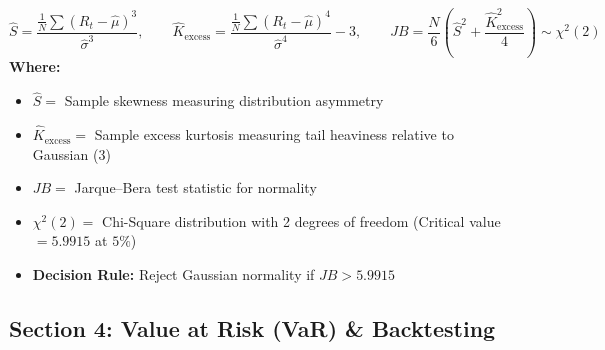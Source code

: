 \begin{formulabox}
\begin{equation*}
\hat{S} = \frac{\frac{1}{N}\sum (R_t - \hat{\mu})^3}{\hat{\sigma}^3}, \qquad \hat{K}_{\text{excess}} = \frac{\frac{1}{N}\sum (R_t - \hat{\mu})^4}{\hat{\sigma}^4} - 3, \qquad JB = \frac{N}{6}\left(\hat{S}^2 + \frac{\hat{K}_{\text{excess}}^2}{4}\right) \sim \chi^2(2)
\end{equation*}
\textbf{Where:}
\begin{itemize}[leftmargin=1.8em, noitemsep]
    \item $\hat{S} =$ Sample skewness measuring distribution asymmetry
    \item $\hat{K}_{\text{excess}} =$ Sample excess kurtosis measuring tail heaviness relative to Gaussian ($3$)
    \item $JB =$ Jarque--Bera test statistic for normality
    \item $\chi^2(2) =$ Chi-Square distribution with 2 degrees of freedom (Critical value $= 5.9915$ at $5\%$)
    \item \textbf{Decision Rule:} Reject Gaussian normality if $JB > 5.9915$
\end{itemize}
\end{formulabox}

\subsection*{Section 4: Value at Risk (VaR) \& Backtesting}

